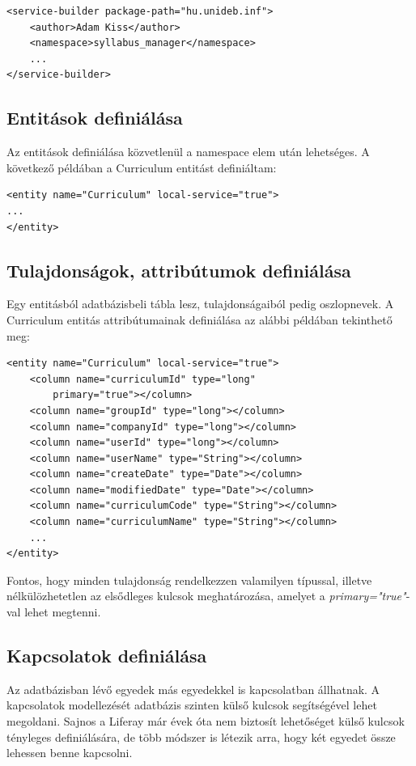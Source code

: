 \documentclass[hidelinks, 12pt, a4paper]{report}
\begin{document}
\begin{lstlisting}[style=customxml]
<service-builder package-path="hu.unideb.inf">
	<author>Adam Kiss</author>
	<namespace>syllabus_manager</namespace>
	...
</service-builder>
\end{lstlisting}

\subsection{Entitások definiálása}

Az entitások definiálása közvetlenül a namespace elem után lehetséges. A következő példában a Curriculum entitást definiáltam:

\begin{lstlisting}[style=customxml]
<entity name="Curriculum" local-service="true">
...
</entity>
\end{lstlisting}

\subsection{Tulajdonságok, attribútumok definiálása}

Egy entitásból adatbázisbeli tábla lesz, tulajdonságaiból pedig oszlopnevek. A Curriculum entitás attribútumainak definiálása az alábbi példában tekinthető meg:

\begin{lstlisting}[style=customxml]
<entity name="Curriculum" local-service="true">
	<column name="curriculumId" type="long"
		primary="true"></column>
	<column name="groupId" type="long"></column>
	<column name="companyId" type="long"></column>
	<column name="userId" type="long"></column>
	<column name="userName" type="String"></column>
	<column name="createDate" type="Date"></column>
	<column name="modifiedDate" type="Date"></column>
	<column name="curriculumCode" type="String"></column>
	<column name="curriculumName" type="String"></column>
	...
</entity>
\end{lstlisting}

\noindent Fontos, hogy minden tulajdonság rendelkezzen valamilyen típussal, illetve nélkülözhetetlen az elsődleges kulcsok meghatározása, amelyet a \emph{primary="true"}-val lehet megtenni.

\subsection{Kapcsolatok definiálása}

Az adatbázisban lévő egyedek más egyedekkel is kapcsolatban állhatnak. A kapcsolatok modellezését adatbázis szinten külső kulcsok segítségével lehet megoldani. Sajnos a Liferay már évek óta nem biztosít lehetőséget külső kulcsok tényleges definiálására, de több módszer is létezik arra, hogy két egyedet össze lehessen benne kapcsolni.
\end{document}
